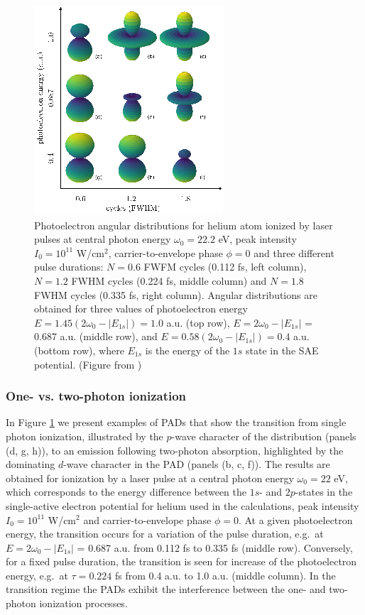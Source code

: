 \begin{figure}[!ht]
\centering
\includegraphics[width=0.5\linewidth]{figs/Photo_ionization/short_pulse/fig_1.png}
\caption{
Photoelectron angular distributions for helium atom ionized by laser pulses at central photon energy $\omega_0 = 22.2$ eV, peak intensity $I_0 = 10^{11}$ W/cm$^2$, carrier-to-envelope phase $\phi = 0$ and three different pulse durations: $N = 0.6$ FWFM cycles (0.112 fs, left column), $N = 1.2$ FWHM cycles (0.224 fs, middle column) and $N = 1.8$ FWHM cycles (0.335 fs, right column). Angular distributions are obtained for three values of photoelectron energy $E = 1.45(2\omega_0 - |E_{1s}|) = 1.0$ a.u. (top row), $E = 2\omega_0 - |E_{1s}|$ = 0.687 a.u. (middle row), and $E = 0.58(2\omega_0 - |E_{1s}|) = 0.4$ a.u. (bottom row), where $E_{1s}$ is the energy of the $1s$ state in the SAE potential. (Figure from \cite{venzke2020_ionization})
} 
  \label{fig:pads}
\end{figure}

\subsubsection{\label{ssub:pads}One- vs. two-photon ionization}
In Figure \ref{fig:pads} we present examples of PADs that show the transition from single photon ionization, illustrated by the $p$-wave character of the distribution (panels (d, g, h)), to an emission following two-photon absorption, highlighted by the dominating $d$-wave character in the PAD (panels (b, c, f)). The results are obtained for ionization by a laser pulse at a central photon energy $\omega_0 = 22$ eV, which corresponds to the energy difference between the $1s$- and $2p$-states in the single-active electron potential for helium used in the calculations, peak intensity $I_0 = 10^{11}$ W/cm$^2$ and carrier-to-envelope phase $\phi = 0$. At a given photoelectron energy, the transition occurs for a variation of the pulse duration, e.g.\ at $E = 2\omega_0 - |E_{1s}|$ = 0.687 a.u. from 0.112 fs to 0.335 fs (middle row). Conversely, for a fixed pulse duration, the transition is seen for increase of the photoelectron energy, e.g.\ at $\tau = 0.224$ fs from 0.4 a.u. to 1.0 a.u. (middle column). In the transition regime the PADs exhibit the interference between the one- and two-photon ionization processes. 


